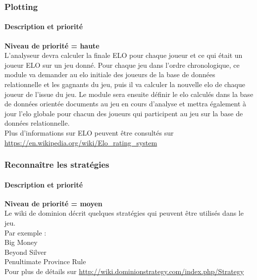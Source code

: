 \subsubsection{Plotting}
\paragraph*{Description et priorité}
\textbf{Niveau de priorité = haute}\\

L'analyseur devra calculer la finale ELO pour chaque joueur et ce qui était un joueur ELO sur un jeu donné.
Pour chaque jeu dans l'ordre chronologique, ce module va demander au elo initiale des joueurs de la base de données relationnelle et les gagnants du jeu, puis il va calculer la nouvelle elo de chaque joueur de l'issue du jeu. Le module sera ensuite définir le elo calculés dans la base de données orientée documents au jeu en cours d'analyse et mettra également à jour l'elo globale pour chacun des joueurs qui participent au jeu sur la base de données relationnelle.\\

Plus d'informations sur ELO peuvent être consultés sur \url{https://en.wikipedia.org/wiki/Elo_rating_system}\\

\subsubsection{Reconnaître les stratégies}
\paragraph*{Description et priorité}
\textbf{Niveau de priorité = moyen}\\

Le wiki de dominion décrit quelques stratégies qui peuvent être utilisés dans le jeu.\\Par exemple :\\
Big Money\\
Beyond Silver\\
Penultimate Province Rule\\
Pour plus de détails sur \url{http://wiki.dominionstrategy.com/index.php/Strategy}\\



